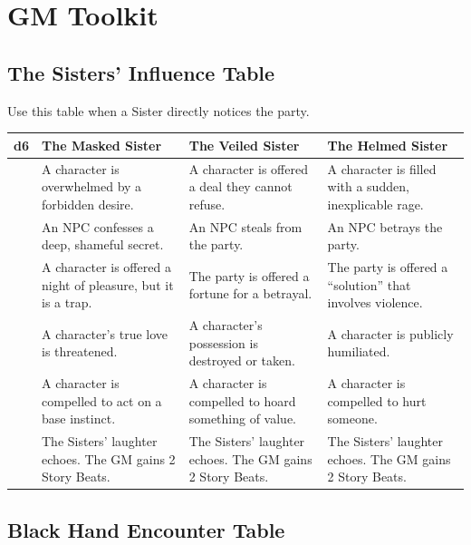 \documentclass[11pt,twoside]{book}
\begin{document}
\chapter{GM Toolkit}

\section{The Sisters' Influence Table}

Use this table when a Sister directly notices the party.

\begin{tabularx}{\textwidth}{>{\centering\arraybackslash}p{} >{\raggedright\arraybackslash}p{} >{\raggedright\arraybackslash}p{} >{\raggedright\arraybackslash}p{}}
\toprule
\textbf{d6} & \textbf{The Masked Sister} & \textbf{The Veiled Sister} & \textbf{The Helmed Sister} \\
\midrule
1 & A character is overwhelmed by a forbidden desire. & A character is offered a deal they cannot refuse. & A character is filled with a sudden, inexplicable rage. \\
2 & An NPC confesses a deep, shameful secret. & An NPC steals from the party. & An NPC betrays the party. \\
3 & A character is offered a night of pleasure, but it is a trap. & The party is offered a fortune for a betrayal. & The party is offered a ``solution'' that involves violence. \\
4 & A character's true love is threatened. & A character's possession is destroyed or taken. & A character is publicly humiliated. \\
5 & A character is compelled to act on a base instinct. & A character is compelled to hoard something of value. & A character is compelled to hurt someone. \\
6 & The Sisters' laughter echoes. The GM gains 2 Story Beats. & The Sisters' laughter echoes. The GM gains 2 Story Beats. & The Sisters' laughter echoes. The GM gains 2 Story Beats. \\
\bottomrule
\end{tabularx}

\section{Black Hand Encounter Table}
\end{document}
